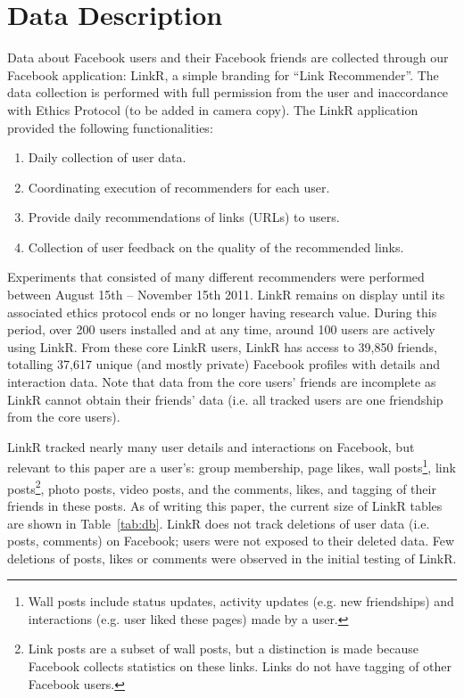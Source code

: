 \documentclass[letterpaper]{article}
\begin{document}
\section{Data Description}


Data about Facebook users and their Facebook friends are collected through our Facebook application: LinkR, a simple branding for ``Link Recommender''. The data collection is performed with full permission from the user and inaccordance with Ethics Protocol (to be added in camera copy). The LinkR application provided the following functionalities:
\begin{enumerate}
\item Daily collection of user data.
\item Coordinating execution of recommenders for each user.
\item Provide daily recommendations of links (URLs) to users.
\item Collection of user feedback on the quality of the recommended links.
\end{enumerate}
Experiments that consisted of many different recommenders were performed between August 15th -- November 15th 2011. LinkR remains on display until its associated ethics protocol ends or no longer having research value. During this period, over 200 users installed and at any time, around 100 users are actively using LinkR. From these core LinkR users, LinkR has access to 39,850 friends, totalling 37,617 unique (and mostly private) Facebook profiles with details and interaction data. Note that data from the core users' friends are incomplete as LinkR cannot obtain their friends' data (i.e. all tracked users are one friendship from the core users).


LinkR tracked nearly many user details and interactions on Facebook, but relevant to this paper are a user's: group membership, page likes, wall posts\footnote{Wall posts include status updates, activity updates (e.g. new friendships) and interactions (e.g. user liked these pages) made by a user.}, link posts\footnote{Link posts are a subset of wall posts, but a distinction is made because Facebook collects statistics on these links. Links do not have tagging of other Facebook users.}, photo posts, video posts, and the comments, likes, and tagging of their friends in these posts. As of writing this paper, the current size of LinkR tables are shown in Table~\ref{tab:db}. LinkR does not track deletions of user data (i.e. posts, comments) on Facebook; users were not exposed to their deleted data. Few deletions of posts, likes or comments were observed in the initial testing of LinkR.
\end{document}

